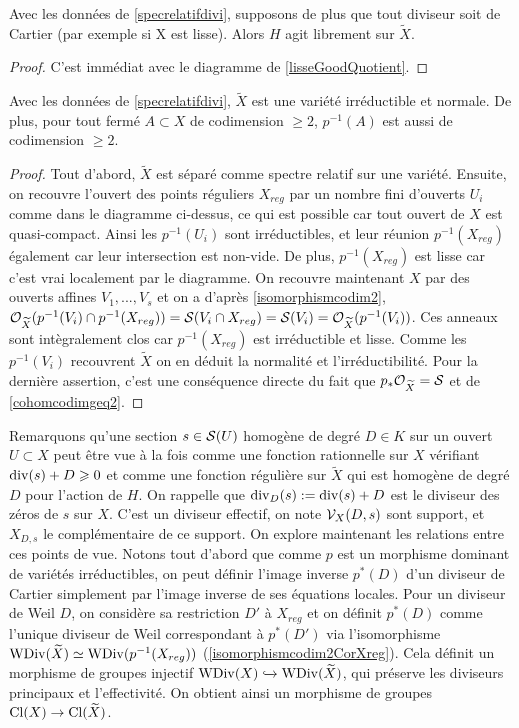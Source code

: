 \begin{prop}
Avec les données de \ref{specrelatifdivi}, supposons de plus que tout diviseur soit de Cartier (par exemple si X est lisse). Alors $H$ agit librement sur $\widetilde{X}$.
\end{prop}
\begin{proof}
C'est immédiat avec le diagramme de \ref{lisseGoodQuotient}.
\end{proof}


\begin{prop}\label{preimagecodim2}
Avec les données de \ref{specrelatifdivi}, $\widetilde{X}$ est une variété irréductible et normale. De plus, pour tout fermé $A\subset X$ de codimension $\geq 2$, $p^{-1}(A)$ est aussi de codimension $\geq 2$.
\end{prop}
\begin{proof}
Tout d'abord, $\widetilde{X}$ est séparé comme spectre relatif sur une variété. Ensuite, on recouvre l'ouvert des points réguliers $X_{reg}$ par un nombre fini d'ouverts $U_i$ comme dans le diagramme ci-dessus, ce qui est possible car tout ouvert de $X$ est quasi-compact. Ainsi les $p^{-1}(U_i)$ sont irréductibles, et leur réunion $p^{-1}(X_{reg})$ également car leur intersection est non-vide. De plus, $p^{-1}(X_{reg})$ est lisse car c'est vrai localement par le diagramme. On recouvre maintenant $X$ par des ouverts affines $V_1,...,V_s$ et on a d'après \ref{isomorphismcodim2}, $\mathcal{O}_{\widetilde{X}}(p^{-1}(V_i)\cap p^{-1}(X_{reg}))=\mathcal{S}(V_i\cap X_{reg})=\mathcal{S}(V_i)=\mathcal{O}_{\widetilde{X}}(p^{-1}(V_i))$. Ces anneaux sont intègralement clos car $p^{-1}(X_{reg})$ est irréductible et lisse. Comme les $p^{-1}(V_i)$ recouvrent $\widetilde{X}$ on en déduit la normalité et l'irréductibilité.
Pour la dernière assertion, c'est une conséquence directe du fait que $p_*\mathcal{O}_{\widetilde{X}}=\mathcal{S}$ et de \ref{cohomcodimgeq2}.
\end{proof}

Remarquons qu'une section $s\in \mathcal{S}(U)$ homogène de degré $D\in K$ sur un ouvert $U\subset X$ peut être vue à la fois comme une fonction rationnelle sur $X$ vérifiant $\operatorname{div}(s)+D\geqslant 0$ et comme une fonction régulière sur $\widetilde{X}$ qui est homogène de degré $D$ pour l'action de $H$. On rappelle que $\operatorname{div}_D(s):=\operatorname{div}(s)+D$ est le diviseur des zéros de $s$ sur $X$. C'est un diviseur effectif, on note $\mathcal{V}_X(D,s)$ sont support, et $X_{D,s}$ le complémentaire de ce support. On explore maintenant les relations entre ces points de vue. Notons tout d'abord que comme $p$ est un morphisme dominant de variétés irréductibles, on peut définir l'image inverse $p^*(D)$ d'un diviseur de Cartier simplement par l'image inverse de ses équations locales. Pour un diviseur de Weil $D$, on considère sa restriction $D'$ à $X_{reg}$ et on définit $p^*(D)$ comme l'unique diviseur de Weil correspondant à $p^*(D')$ via l'isomorphisme $\operatorname{WDiv}(\widetilde{X})\simeq\operatorname{WDiv}(p^{-1}(X_{reg}))$ (\ref{isomorphismcodim2CorXreg}). Cela définit un morphisme de groupes injectif $\operatorname{WDiv}(X)\xhookrightarrow{}\operatorname{WDiv}(\widetilde{X})$, qui préserve les diviseurs principaux et l'effectivité. On obtient ainsi un morphisme de groupes $\operatorname{Cl}(X)\rightarrow \operatorname{Cl}(\widetilde{X})$.

